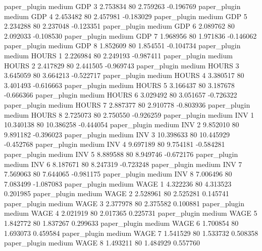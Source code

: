        paper_plugin     medium      GDP                 3  2.753834 80       2.759263          -0.196769
       paper_plugin     medium      GDP                 4  2.453482 80       2.457981          -0.183029
       paper_plugin     medium      GDP                 5  2.234288 80       2.237048          -0.123351
       paper_plugin     medium      GDP                 6  2.089762 80       2.092033          -0.108530
       paper_plugin     medium      GDP                 7  1.968956 80       1.971836          -0.146062
       paper_plugin     medium      GDP                 8  1.852609 80       1.854551          -0.104734
       paper_plugin     medium    HOURS                 1  2.226984 80       2.249193          -0.987411
       paper_plugin     medium    HOURS                 2  2.417829 80       2.441505          -0.969743
       paper_plugin     medium    HOURS                 3  3.645059 80       3.664213          -0.522717
       paper_plugin     medium    HOURS                 4  3.380517 80       3.401493          -0.616663
       paper_plugin     medium    HOURS                 5  3.166437 80       3.187678          -0.666366
       paper_plugin     medium    HOURS                 6  3.029492 80       3.051657          -0.726322
       paper_plugin     medium    HOURS                 7  2.887377 80       2.910778          -0.803936
       paper_plugin     medium    HOURS                 8  2.725073 80       2.750550          -0.926259
       paper_plugin     medium      INV                 1 10.340138 80      10.386258          -0.444054
       paper_plugin     medium      INV                 2  9.852010 80       9.891182          -0.396023
       paper_plugin     medium      INV                 3 10.398633 80      10.445929          -0.452768
       paper_plugin     medium      INV                 4  9.697189 80       9.754181          -0.584281
       paper_plugin     medium      INV                 5  8.889588 80       8.949746          -0.672176
       paper_plugin     medium      INV                 6  8.187671 80       8.247319          -0.723248
       paper_plugin     medium      INV                 7  7.569063 80       7.644065          -0.981175
       paper_plugin     medium      INV                 8  7.006496 80       7.083499          -1.087083
       paper_plugin     medium     WAGE                 1  4.322236 80       4.313523           0.201985
       paper_plugin     medium     WAGE                 2  2.528961 80       2.525281           0.145741
       paper_plugin     medium     WAGE                 3  2.377978 80       2.375582           0.100881
       paper_plugin     medium     WAGE                 4  2.021919 80       2.017365           0.225731
       paper_plugin     medium     WAGE                 5  1.842772 80       1.837267           0.299633
       paper_plugin     medium     WAGE                 6  1.700854 80       1.693073           0.459584
       paper_plugin     medium     WAGE                 7  1.541529 80       1.533732           0.508358
       paper_plugin     medium     WAGE                 8  1.493211 80       1.484929           0.557760